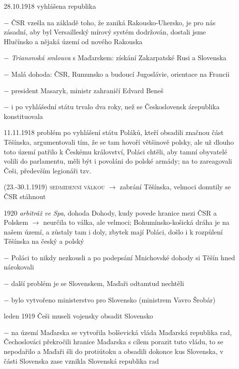 \documentclass{article}
\begin{document}
\begin{itemize}
    \vspace{-0.5em}
    \setlength\itemsep{0.15em}
    \item[28.10.1918] vyhlášena republika
    \item[$-$] ČSR vzešla na základě toho, že zaniká Rakousko-Uhersko, je pro nás zásadní, aby byl Versailleský mírový systém dodržován, dostali jsme Hlučínsko a nějaká území od nového Rakouska
    \item[$-$] \textit{Trianonská smlouva} s Maďarskem: získání Zakarpatské Rusi a Slovenska
    \item[$-$] Malá dohoda: ČSR, Rumunsko a budoucí Jugoslávie, orientace na Francii
    \item[$-$] president Masaryk, ministr zahraničí Edvard Beneš
    \item[$-$] i po vyhlášední státu trvalo dva roky, než se Československ árepublika konstituovala
    \item[11.11.1918] problém po vyhlášení státu Poláků, kteří obsadili značnou část Těšínska, argumentovali tím, že se tam hovoří většinově polsky, ale už dlouho toto území patřilo k Českému království, Poláci chtěli, aby tamní obyvatelé volili do parlamentu, měli být i povoláni do polské armády; na to zareagovali Češi, především legionáři tzv.
    \item[(23.-30.1.1919)] \textsc{sedmidenní válkou} $\rightarrow$ zabrání Těšínska, velmoci donutily se ČSR stáhnout
    \item[1920] \textit{arbitráž ve Spa}, dohoda Dohody, kudy povede hranice mezi ČSR a Polskem $\rightarrow$ neurčila to válka, ale velmoci; Bohumínsko-košická dráha je na našem území, a zůstaly tam i doly, zbytek mají Poláci, došlo i k rozpůlení Těšínska na český a polský
    \item[$-$] Poláci to nikdy nezkousli a po podepsání Mnichovské dohody si Těšín hned nárokovali
    \item[$-$] další problém je se Slovenskem, Maďaři odtamtud nechtěli
    \item[$-$] bylo vytvořeno ministerstvo pro Slovensko (ministrem Vavro Šrobár)
    \item[leden 1919] Češi museli vojensky obsadit Slovensko
    \item[$-$] na území Maďarska se vytvořila bolševická vláda Maďarská republika rad, Čechoslováci překročili hranice Maďarska s cílem porazit tuto vládu, to se nepodařilo a Maďaři šli do protiútoku a obsadili dokonce kus Slovenska, v části Slovenska zase vznikla Slovenská republika rad

\end{itemize}
\end{document}

